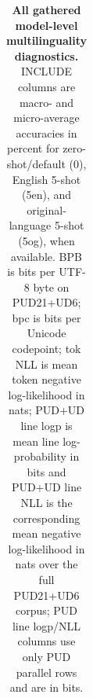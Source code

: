 \begin{table}[t]
{\begin{tabular}{lrrrrrrrrrrrrrr}
\bottomrule
\end{tabular}%
}
\caption{\textbf{All gathered model-level multilinguality diagnostics.} INCLUDE columns are macro- and micro-average accuracies in percent for zero-shot/default (0), English 5-shot (5en), and original-language 5-shot (5og), when available. BPB is bits per UTF-8 byte on PUD21+UD6; bpc is bits per Unicode codepoint; tok NLL is mean token negative log-likelihood in nats; PUD+UD line logp is mean line log-probability in bits and PUD+UD line NLL is the corresponding mean negative log-likelihood in nats over the full PUD21+UD6 corpus; PUD line logp/NLL columns use only PUD parallel rows and are in bits.}
\label{tab:model-multilinguality-all-scores}
\end{table}
